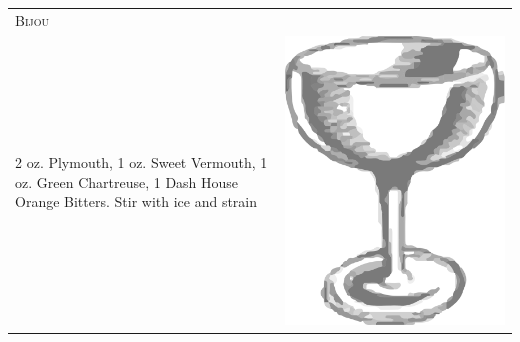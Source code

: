 \documentclass{article}
\begin{document}
\begin{tabular}{p{2in} p{0.5in}}
\multicolumn{2}{p{3in}}{\centering\Huge\textsc{Bijou}}\\ 
  \vspace{-0.1in}2 oz. Plymouth, 1 oz. Sweet Vermouth, 1 oz. Green Chartreuse, 1 Dash House Orange Bitters. Stir with ice and strain &
  \vspace{-0.1in} \includegraphics{egg_coupe.png}
\end{tabular}
\end{document}
